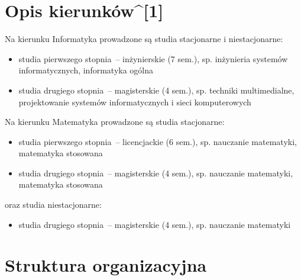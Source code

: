 \documentclass[a4paper,12pt]{article}
\begin{document}
\section{Opis kierunków^{[1]}}
Na kierunku Informatyka prowadzone są studia stacjonarne i niestacjonarne:
\begin{itemize}
\item studia pierwszego stopnia~-- inżynierskie (7 sem.), sp. inżynieria systemów informatycznych, informatyka
ogólna
\item studia drugiego stopnia~-- magisterskie (4 sem.), sp. techniki multimedialne, projektowanie systemów
informatycznych i sieci komputerowych
\end{itemize}
Na kierunku Matematyka prowadzone są studia stacjonarne:
\begin{itemize}
\item studia pierwszego stopnia~-- licencjackie (6 sem.), sp. nauczanie matematyki, matematyka stosowana
\item studia drugiego stopnia~-- magisterskie (4 sem.), sp. nauczanie matematyki, matematyka stosowana
\end{itemize}
oraz studia niestacjonarne:
\begin{itemize}
\item studia drugiego stopnia~-- magisterskie (4 sem.), sp. nauczanie matematyki
\end{itemize}
\section{Struktura organizacyjna}
\end{document}
